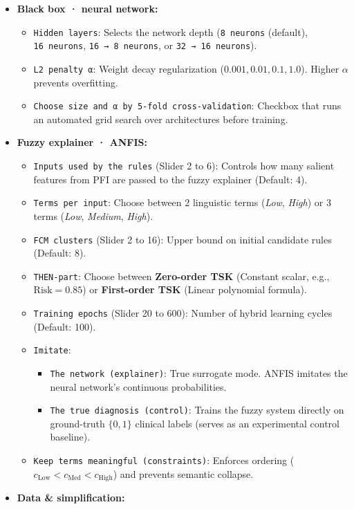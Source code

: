 \documentclass[10pt,a4paper]{article}
\providecommand{\tightlist}{\setlength{\itemsep}{1pt}\setlength{\parskip}{1pt}}
\begin{document}
\begin{itemize}
\tightlist
\item
  \textbf{Black box · neural network:}

  \begin{itemize}
  \tightlist
  \item
    \texttt{Hidden\ layers}: Selects the network depth
    (\texttt{8\ neurons} (default), \texttt{16\ neurons},
    \texttt{16\ →\ 8\ neurons}, or \texttt{32\ →\ 16\ neurons}).
  \item
    \texttt{L2\ penalty\ α}: Weight decay regularization
    (\(0.001, 0.01, 0.1, 1.0\)). Higher \(\alpha\) prevents overfitting.
  \item
    \texttt{Choose\ size\ and\ α\ by\ 5-fold\ cross-validation}:
    Checkbox that runs an automated grid search over architectures
    before training.
  \end{itemize}
\item
  \textbf{Fuzzy explainer · ANFIS:}

  \begin{itemize}
  \tightlist
  \item
    \texttt{Inputs\ used\ by\ the\ rules} (Slider 2 to 6): Controls how
    many salient features from PFI are passed to the fuzzy explainer
    (Default: 4).
  \item
    \texttt{Terms\ per\ input}: Choose between 2 linguistic terms
    (\emph{Low}, \emph{High}) or 3 terms (\emph{Low}, \emph{Medium},
    \emph{High}).
  \item
    \texttt{FCM\ clusters} (Slider 2 to 16): Upper bound on initial
    candidate rules (Default: 8).
  \item
    \texttt{THEN-part}: Choose between \textbf{Zero-order TSK} (Constant
    scalar, e.g., \(\text{Risk} = 0.85\)) or \textbf{First-order TSK}
    (Linear polynomial formula).
  \item
    \texttt{Training\ epochs} (Slider 20 to 600): Number of hybrid
    learning cycles (Default: 100).
  \item
    \texttt{Imitate}:

    \begin{itemize}
    \tightlist
    \item
      \texttt{The\ network\ (explainer)}: True surrogate mode. ANFIS
      imitates the neural network's continuous probabilities.
    \item
      \texttt{The\ true\ diagnosis\ (control)}: Trains the fuzzy system
      directly on ground-truth \(\{0, 1\}\) clinical labels (serves as
      an experimental control baseline).
    \end{itemize}
  \item
    \texttt{Keep\ terms\ meaningful\ (constraints)}: Enforces ordering
    (\(c_{\text{Low}} < c_{\text{Med}} < c_{\text{High}}\)) and prevents
    semantic collapse.
  \end{itemize}
\item
  \textbf{Data \& simplification:}


\end{itemize}
\end{document}
